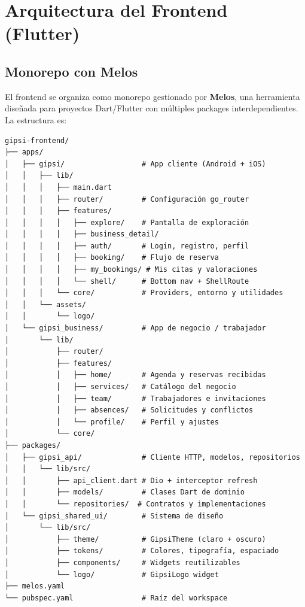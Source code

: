 \documentclass[12pt,a4paper,twoside]{report}
\begin{document}
\section{Arquitectura del Frontend (Flutter)}

\subsection{Monorepo con Melos}

El frontend se organiza como monorepo gestionado por \textbf{Melos}, una herramienta diseñada para proyectos Dart/Flutter con múltiples packages interdependientes. La estructura es:

\begin{lstlisting}[style=yamlStyle, caption={Estructura del monorepo Flutter}, label={lst:monorepo}]
gipsi-frontend/
├── apps/
│   ├── gipsi/                  # App cliente (Android + iOS)
│   │   ├── lib/
│   │   │   ├── main.dart
│   │   │   ├── router/         # Configuración go_router
│   │   │   ├── features/
│   │   │   │   ├── explore/    # Pantalla de exploración
│   │   │   │   ├── business_detail/
│   │   │   │   ├── auth/       # Login, registro, perfil
│   │   │   │   ├── booking/    # Flujo de reserva
│   │   │   │   ├── my_bookings/ # Mis citas y valoraciones
│   │   │   │   └── shell/      # Bottom nav + ShellRoute
│   │   │   └── core/           # Providers, entorno y utilidades
│   │   └── assets/
│   │       └── logo/
│   └── gipsi_business/         # App de negocio / trabajador
│       └── lib/
│           ├── router/
│           ├── features/
│           │   ├── home/       # Agenda y reservas recibidas
│           │   ├── services/   # Catálogo del negocio
│           │   ├── team/       # Trabajadores e invitaciones
│           │   ├── absences/   # Solicitudes y conflictos
│           │   └── profile/    # Perfil y ajustes
│           └── core/
├── packages/
│   ├── gipsi_api/              # Cliente HTTP, modelos, repositorios
│   │   └── lib/src/
│   │       ├── api_client.dart # Dio + interceptor refresh
│   │       ├── models/         # Clases Dart de dominio
│   │       └── repositories/  # Contratos y implementaciones
│   └── gipsi_shared_ui/        # Sistema de diseño
│       └── lib/src/
│           ├── theme/          # GipsiTheme (claro + oscuro)
│           ├── tokens/         # Colores, tipografía, espaciado
│           ├── components/     # Widgets reutilizables
│           └── logo/           # GipsiLogo widget
├── melos.yaml
└── pubspec.yaml                # Raíz del workspace
\end{lstlisting}
\end{document}
